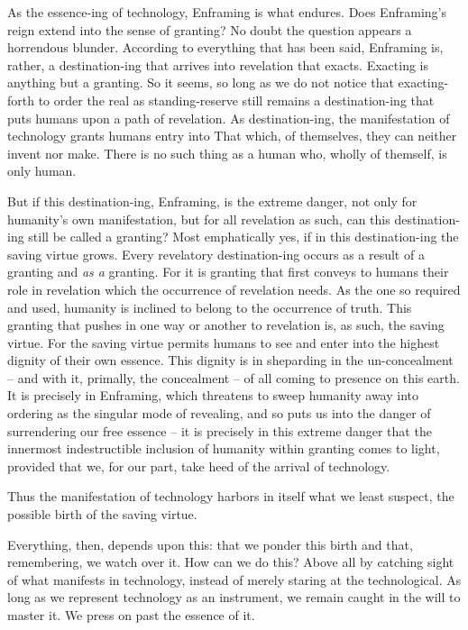 \documentclass[paper=a4, fontsize=11pt,twoside]{scrartcl}
\begin{document}
As the essence-ing of technology, Enframing is what endures. Does Enframing's reign extend into the sense of granting? No doubt the question appears a horrendous blunder. According to everything that has been said, Enframing is, rather, a destination-ing that arrives into revelation that exacts. Exacting is anything but a granting. So it seems, so long as we do not notice that exacting-forth to order the real as standing-reserve still remains a destination-ing that puts humans upon a path of revelation. As destination-ing, the manifestation of technology grants humans entry into That which, of themselves, they can neither invent nor make. There is no such thing as a human who, wholly of themself, is only human.

But if this destination-ing, Enframing, is the extreme danger, not only for humanity's own manifestation, but for all revelation as such, can this destination-ing still be called a granting? Most emphatically yes, if in this destination-ing the saving virtue grows. Every revelatory destination-ing occurs as a result of a granting and \textit{as a} granting. For it is granting that first conveys to humans their role in revelation which the occurrence of revelation needs. As the one so required and used, humanity is inclined to belong to the occurrence of truth. This granting that pushes in one way or another to revelation is, as such, the saving virtue. For the saving virtue permits humans to see and enter into the highest dignity of their own essence. This dignity is in sheparding in the un-concealment -- and with it, primally, the concealment -- of all coming to presence on this earth. It is precisely in Enframing, which threatens to sweep humanity away into ordering as the singular mode of revealing, and so puts us into the danger of surrendering our free essence -- it is precisely in this extreme danger that the innermost indestructible inclusion of humanity within granting comes to light, provided that we, for our part, take heed of the arrival of technology.

Thus the manifestation of technology harbors in itself what we least suspect, the possible birth of the saving virtue. 

Everything, then, depends upon this: that we ponder this birth and that, remembering, we watch over it. How can we do this? Above all by catching sight of what manifests in technology, instead of merely staring at the technological. As long as we represent technology as an instrument, we remain caught in the will to master it. We press on past the essence of it.
\end{document}
